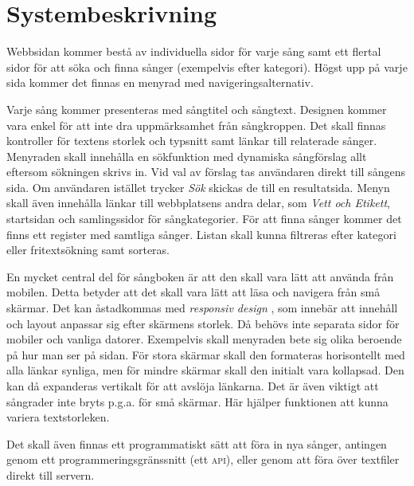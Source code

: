 \section{Systembeskrivning}

Webbsidan kommer bestå av individuella sidor för varje sång samt ett flertal sidor för att söka och finna sånger (exempelvis efter kategori). Högst upp på varje sida kommer det finnas en menyrad med navigeringsalternativ.

Varje sång kommer presenteras med sångtitel och sångtext. Designen kommer vara enkel för att inte dra uppmärksamhet från sångkroppen. Det skall finnas kontroller för textens storlek och typsnitt samt länkar till relaterade sånger. Menyraden skall innehålla en sökfunktion med dynamiska sångförslag allt eftersom sökningen skrivs in. Vid val av förslag tas användaren direkt till sångens sida. Om användaren istället trycker \emph{Sök} skickas de till en resultatsida. Menyn skall även innehålla länkar till webbplatsens andra delar, som \emph{Vett och Etikett}, startsidan och samlingssidor för sångkategorier. För att finna sånger kommer det finns ett register med samtliga sånger. Listan skall kunna filtreras efter kategori eller fritextsökning samt sorteras.

En mycket central del för sångboken är att den skall vara lätt att använda från mobilen. Detta betyder att det skall vara lätt att läsa och navigera från små skärmar. Det kan åstadkommas med \emph{responsiv design} \cite{resp}, som innebär att innehåll och layout anpassar sig efter skärmens storlek. Då behövs inte separata sidor för mobiler och vanliga datorer. Exempelvis skall menyraden bete sig olika beroende på hur man ser på sidan. För stora skärmar skall den formateras horisontellt med alla länkar synliga, men för mindre skärmar skall den initialt vara kollapsad. Den kan då expanderas vertikalt för att avslöja länkarna. Det är även viktigt att sångrader inte bryts p.g.a. för små skärmar. Här hjälper funktionen att kunna variera textstorleken.


Det skall även finnas ett programmatiskt sätt att föra in nya sånger, antingen genom ett programmeringsgränssnitt (ett \textsc{api}), eller genom att föra över textfiler direkt till servern.